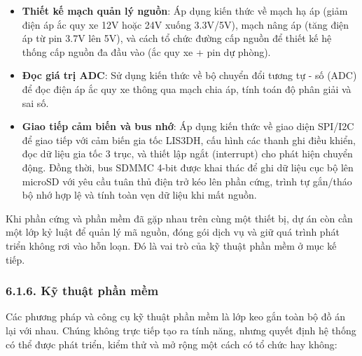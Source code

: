 \documentclass[a4paper]{extarticle}
\providecommand{\tightlist}{%
  \setlength{\itemsep}{0pt}\setlength{\parskip}{0pt}}
\begin{document}
\begin{itemize}
\tightlist
\item
  \textbf{Thiết kế mạch quản lý nguồn}: Áp dụng kiến thức về mạch hạ áp
  (giảm điện áp ắc quy xe 12V hoặc 24V xuống 3.3V/5V), mạch nâng áp
  (tăng điện áp từ pin 3.7V lên 5V), và cách tổ chức đường cấp nguồn để
  thiết kế hệ thống cấp nguồn đa đầu vào (ắc quy xe + pin dự phòng).
\item
  \textbf{Đọc giá trị ADC}: Sử dụng kiến thức về bộ chuyển đổi tương tự
  - số (ADC) để đọc điện áp ắc quy xe thông qua mạch chia áp, tính toán
  độ phân giải và sai số.
\item
  \textbf{Giao tiếp cảm biến và bus nhớ}: Áp dụng kiến thức về giao diện
  SPI/I2C để giao tiếp với cảm biến gia tốc LIS3DH, cấu hình các thanh
  ghi điều khiển, đọc dữ liệu gia tốc 3 trục, và thiết lập ngắt
  (interrupt) cho phát hiện chuyển động. Đồng thời, bus SDMMC 4-bit được
  khai thác để ghi dữ liệu cục bộ lên microSD với yêu cầu tuân thủ
  điện trở kéo lên phần cứng, trình tự gắn/tháo bộ nhớ hợp lệ và tính toàn vẹn dữ liệu khi
  mất nguồn.
\end{itemize}

Khi phần cứng và phần mềm đã gặp nhau trên cùng một thiết bị, dự án còn
cần một lớp kỷ luật để quản lý mã nguồn, đóng gói dịch vụ và giữ quá
trình phát triển không rơi vào hỗn loạn. Đó là vai trò của kỹ thuật phần
mềm ở mục kế tiếp.

\subsubsection{6.1.6. Kỹ thuật phần
mềm}\label{616-kux1ef9-thuux1eadt-phux1ea7n-mux1ec1m}

Các phương pháp và công cụ kỹ thuật phần mềm là lớp keo gắn toàn bộ đồ
án lại với nhau. Chúng không trực tiếp tạo ra tính năng, nhưng quyết
định hệ thống có thể được phát triển, kiểm thử và mở rộng một cách có tổ
chức hay không:
\end{document}
